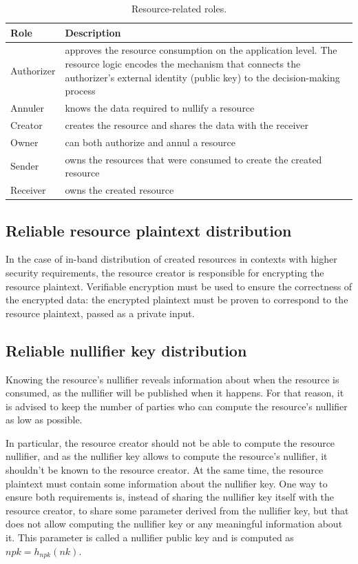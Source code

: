 \begin{table}[!h]
\begin{center}
\begin{tabular}{|p{1.5cm}|p{13cm}|}
\hline
 \textbf{Role} & \textbf{Description} \\ \hline
 Authorizer & approves the resource consumption on the application level. The resource logic encodes the mechanism that connects the authorizer's external identity (public key) to the decision-making process \\ \hline
 Annuler & knows the data required to nullify a resource
 \\ \hline
Creator & creates the resource and shares the data with the receiver
\\ \hline
Owner & can both authorize and annul a resource
\\ \hline
Sender & owns the resources that were consumed to create the created resource
\\ \hline
Receiver & owns the created resource
\\ \hline
\end{tabular}
\caption{Resource-related roles.}
\end{center}
\end{table}

\subsection{Reliable resource plaintext distribution}

In the case of in-band distribution of created resources in contexts with higher security requirements, the resource creator is responsible for encrypting the resource plaintext. Verifiable encryption must be used to ensure the correctness of the encrypted data: the encrypted plaintext must be proven to correspond to the resource plaintext, passed as a private input.

\subsection{Reliable nullifier key distribution}

Knowing the resource’s nullifier reveals information about when the resource is consumed, as the nullifier will be published when it happens. For that reason, it is advised to keep the number of parties who can compute the resource’s nullifier as low as possible.

In particular, the resource creator should not be able to compute the resource nullifier, and as the nullifier key allows to compute the resource's nullifier, it shouldn't be known to the resource creator.
At the same time, the resource plaintext must contain some information about the nullifier key. One way to ensure both requirements is, instead of sharing the nullifier key itself with the resource creator, to share some parameter derived from the nullifier key, but that does not allow computing the nullifier key or any meaningful information about it. This parameter is called a nullifier public key and is computed as $npk = h_{npk}(nk)$.

